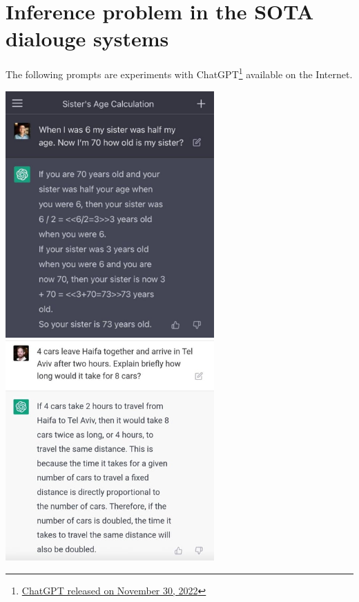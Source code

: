 \documentclass[12pt,onecolumn,a4paper]{article}
\begin{document}
\section{Inference problem in the SOTA dialouge systems}
\label{appendix:gpt}
The following prompts are experiments with ChatGPT\footnote{\href{https://openai.com/blog/chatgpt/}{ChatGPT released on November 30, 2022}} available on the Internet.
\begin{center}%
    \includegraphics[width=8cm]{ChatGPT_1.png} 
    \qquad
    \includegraphics[width=8cm]{chatGPT_2.jpg}
\end{center}
\end{document}
